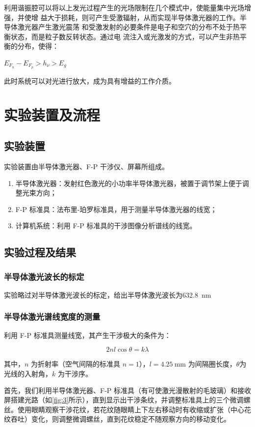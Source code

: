 \documentclass[font=default]{mpltx}
\begin{document}
利用谐振腔可以将以上发光过程产生的光场限制在几个模式中，使能量集中光场增强，并使增
益大于损耗，则可产生受激辐射，从而实现半导体激光器的工作。半导体激光器产生激光震荡
和受激发射的必要条件是电子和空穴的分布不处于热平衡状态，而是粒子数反转状态。通过电
流注入或光激发的方式，可以产生非热平衡的分布，使得：

$E_{F_n} - E_{F_p} > h_\nu > E_g$

此时系统可以对光进行放大，成为具有增益的工作介质。

\section{实验装置及流程}
\subsection{实验装置}
实验装置由半导体激光器、F-P 干涉仪、屏幕所组成。
\begin{enumerate}
	\item 半导体激光器：发射红色激光的小功率半导体激光器，被置于调节架上便于调整光束方向；
	\item F-P 标准具：法布里-珀罗标准具，用于测量半导体激光器的线宽；
	\item 计算机系统：利用 F-P 标准具的干涉图像分析谱线的线宽。
\end{enumerate}

\subsection{实验过程及结果}
\subsubsection{半导体激光波长的标定}

实验略过对半导体激光波长的标定，给出半导体激光波长为\qty{632.8}{\nm}\par

\subsubsection{半导体激光谱线宽度的测量}
利用 F-P 标准具测量线宽，其产生干涉极大的条件为：

$$2nl\cos{\theta} = k\lambda$$

其中，$n$ 为折射率（空气间隔的标准具 $n = 1$），$l = \qty{4.25}{\mm}$ 为间隔圈长度，$\theta$为光线的入射角，$k$ 为干涉序。

首先，我们利用半导体激光器、F-P 标准具（有可使激光漫散射的毛玻璃）和接收屏搭建光路（如\autoref{fig:3}所示），直到显示出干涉条纹，并调整标准具上的三个微调螺丝。使用眼睛观察干涉花纹，若花纹随眼睛上下左右移动时有收缩或扩张（中心花纹吞吐）变化，则调整微调螺丝，直到花纹稳定不随观察方向的移动变化。
\end{document}
